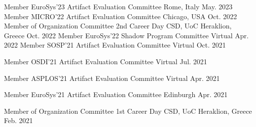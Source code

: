 \begin{cvhonors}
	\cvhonor
	{Member} %
	{EuroSys'23 Artifact Evaluation Committee} %
	{Rome, Italy} %
	{May. 2023} %
	\cvhonor
	{Member} %
	{MICRO'22 Artifact Evaluation Committee} %
	{Chicago, USA} %
	{Oct. 2022} %
	\cvhonor
	{Member of Organization Committee} %
	{2nd Career Day CSD, UoC} %
	{Heraklion, Greece} %
	{Oct. 2022} %
	\cvhonor
	{Member} %
	{EuroSys'22 Shadow Program Committee} %
	{Virtual} %
	{Apr. 2022} %
	\cvhonor
	{Member} %
	{SOSP'21 Artifact Evaluation Committee} %
	{Virtual} %
	{Oct. 2021} %

	\cvhonor
	{Member} %
	{OSDI'21 Artifact Evaluation Committee} %
	{Virtual} %
	{Jul. 2021} %

	\cvhonor
	{Member} %
	{ASPLOS'21 Artifact Evaluation Committee} %
	{Virtual} %
	{Apr. 2021} %


	\cvhonor
	{Member} %
	{EuroSys'21 Artifact Evaluation Committee} %
	{Edinburgh} %
	{Apr. 2021} %

	\cvhonor
	{Member of Organization Committee} %
	{1st Career Day CSD, UoC} %
	{Heraklion, Greece} %
	{Feb. 2021} %


\end{cvhonors}
